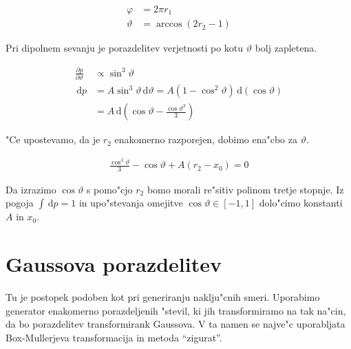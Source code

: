 \documentclass[a4paper,10pt]{article}
\newcommand{\dd}{\,\mathrm{d}}
\begin{document}
\begin{align}
 \varphi &= 2\pi r_1 \\
 \vartheta &= \arccos (2r_2-1)
\end{align}

Pri dipolnem sevanju je porazdelitev verjetnosti po kotu $\vartheta$ bolj zapletena. 

\begin{align}
 \frac{\partial p}{\partial \vartheta} & \propto \sin^3\vartheta \\
  \dd p &= A \sin^3 \vartheta \dd \vartheta = A(1-\cos^2\vartheta) \dd (\cos\vartheta) \\
&= A \dd\left( \cos\vartheta - \frac{\cos\vartheta^3}{3} \right)
\end{align}

"Ce upostevamo, da je $r_2$ enakomerno razporejen, dobimo ena"cbo za $\vartheta$. 

\begin{align}
\frac{\cos^3\vartheta}{3} - \cos\vartheta + A(r_2 - x_0) = 0
\end{align}


Da izrazimo $\cos\vartheta$ s pomo"cjo $r_2$ bomo morali re"sitiv polinom tretje stopnje. Iz pogoja $\int\!\!\dd p=1$ in upo"stevanja omejitve $\cos\vartheta \in [-1,1]$ dolo"cimo konstanti $A$ in $x_0$. 

\section{Gaussova porazdelitev}

Tu je postopek podoben kot pri generiranju naklju"cnih smeri. Uporabimo generator enakomerno porazdeljenih "stevil, ki jih transformiramo na tak na"cin, da bo porazdelitev transformirank Gaussova. V ta namen se najve"c uporabljata Box-Mullerjeva transformacija in metoda ``zigurat''. 
\end{document}
